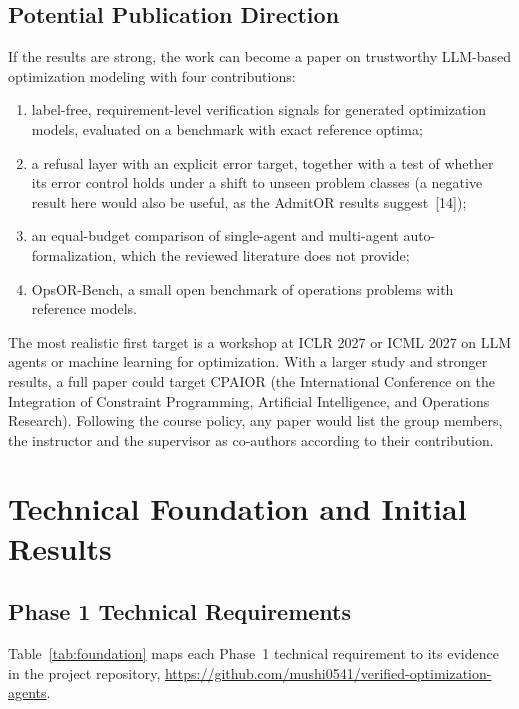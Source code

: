 \documentclass[11pt,a4paper]{article}
\begin{document}
\FloatBarrier
\subsection{Potential Publication Direction}

If the results are strong, the work can become a paper on trustworthy LLM-based optimization modeling with four contributions:
\begin{enumerate}[leftmargin=1.6em]
\item label-free, requirement-level verification signals for generated optimization models, evaluated on a benchmark with exact reference optima;
\item a refusal layer with an explicit error target, together with a test of whether its error control holds under a shift to unseen problem classes (a negative result here would also be useful, as the AdmitOR results suggest~[14]);
\item an equal-budget comparison of single-agent and multi-agent auto-formalization, which the reviewed literature does not provide;
\item OpsOR-Bench, a small open benchmark of operations problems with reference models.
\end{enumerate}
The most realistic first target is a workshop at ICLR 2027 or ICML 2027 on LLM agents or machine learning for optimization. With a larger study and stronger results, a full paper could target CPAIOR (the International Conference on the Integration of Constraint Programming, Artificial Intelligence, and Operations Research). Following the course policy, any paper would list the group members, the instructor and the supervisor as co-authors according to their contribution.

\FloatBarrier
\section{Technical Foundation and Initial Results}
\label{sec:results}

\subsection{Phase 1 Technical Requirements}

Table~\ref{tab:foundation} maps each Phase~1 technical requirement to its evidence in the project repository, \url{https://github.com/mushi0541/verified-optimization-agents}.
\end{document}
